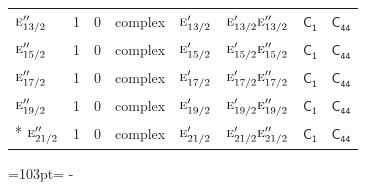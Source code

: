 \documentclass[10pt,a4paper]{article}
\newcommand{\needspace}[1]{\par\penalty-100\begingroup\dimen0=#1\relax\dimen2=\pagegoal
  \advance\dimen2-\pagetotal\ifdim\dimen0>\dimen2\relax\ifdim\dimen2>0pt\vfil\break\fi\fi
  \endgroup}
\numberwithin{equation}{section}
\newcommand{\grp}[1]{\mathsf{#1}}
\newcommand{\irr}[1]{\text{\normalfont\scshape #1}}
\begin{document}
{\begin{longtable}{@{}lrrlllll@{}}
$\irr{e}_{13/2}''$ & 1 & $0$ & complex & $\irr{e}_{13/2}'$ & $\irr{e}_{13/2}'\irr{e}_{13/2}''$ & \href{C1.pdf}{$\grp{C_{1}}$} & $\grp{C_{44}}$\\
$\irr{e}_{15/2}''$ & 1 & $0$ & complex & $\irr{e}_{15/2}'$ & $\irr{e}_{15/2}'\irr{e}_{15/2}''$ & \href{C1.pdf}{$\grp{C_{1}}$} & $\grp{C_{44}}$\\
$\irr{e}_{17/2}''$ & 1 & $0$ & complex & $\irr{e}_{17/2}'$ & $\irr{e}_{17/2}'\irr{e}_{17/2}''$ & \href{C1.pdf}{$\grp{C_{1}}$} & $\grp{C_{44}}$\\
$\irr{e}_{19/2}''$ & 1 & $0$ & complex & $\irr{e}_{19/2}'$ & $\irr{e}_{19/2}'\irr{e}_{19/2}''$ & \href{C1.pdf}{$\grp{C_{1}}$} & $\grp{C_{44}}$\\*
$\irr{e}_{21/2}''$ & 1 & $0$ & complex & $\irr{e}_{21/2}'$ & $\irr{e}_{21/2}'\irr{e}_{21/2}''$ & \href{C1.pdf}{$\grp{C_{1}}$} & $\grp{C_{44}}$\\
\bottomrule\end{longtable}}
\needspace{103pt}
\end{document}
